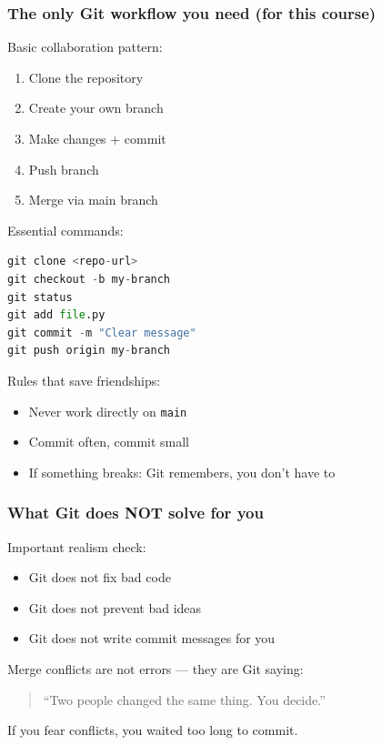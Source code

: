 \begin{frame}[fragile]
  \frametitle{The only Git workflow you need (for this course)}
  Basic collaboration pattern:
  \begin{enumerate}
    \item Clone the repository
    \item Create your own branch
    \item Make changes + commit
    \item Push branch
    \item Merge via main branch
  \end{enumerate}

  \pause
  Essential commands:
  \begin{lstlisting}[language=Python]
git clone <repo-url>
git checkout -b my-branch
git status
git add file.py
git commit -m "Clear message"
git push origin my-branch
  \end{lstlisting}

  \pause
  Rules that save friendships:
  \begin{itemize}
    \item Never work directly on \texttt{main}
    \item Commit often, commit small
    \item If something breaks: Git remembers, you don’t have to
  \end{itemize}
\end{frame}

\begin{frame}
  \frametitle{What Git does NOT solve for you}
  Important realism check:
  \begin{itemize}
    \item Git does not fix bad code
    \item Git does not prevent bad ideas
    \item Git does not write commit messages for you
  \end{itemize}

  \vspace{0.5em}
  Merge conflicts are not errors — they are Git saying:
  \begin{quote}
    “Two people changed the same thing.  
    You decide.”
  \end{quote}

  If you fear conflicts, you waited too long to commit.
\end{frame}


